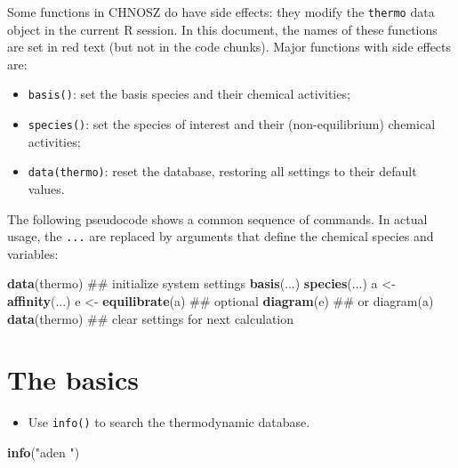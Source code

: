 \documentclass[]{tufte-handout}
\newenvironment{Shaded}{}{}
\newcommand{\KeywordTok}[1]{\textcolor[rgb]{0.00,0.44,0.13}{\textbf{#1}}}
\newcommand{\StringTok}[1]{\textcolor[rgb]{0.25,0.44,0.63}{#1}}
\newcommand{\NormalTok}[1]{#1}
\providecommand{\tightlist}{%
  \setlength{\itemsep}{0pt}\setlength{\parskip}{0pt}}
\begin{document}
Some functions in CHNOSZ do have side effects: they modify the
\texttt{thermo} data object in the current R session. In this document,
the names of these functions are set in {red text} (but not in the code
chunks). Major functions with side effects are:

\begin{itemize}
\tightlist
\item
  {\texttt{basis()}}: set the basis species and their chemical
  activities;
\item
  {\texttt{species()}}: set the species of interest and their
  (non-equilibrium) chemical activities;
\item
  {\texttt{data(thermo)}}: reset the database, restoring all settings to
  their default values.
\end{itemize}

The following pseudocode shows a common sequence of commands. In actual
usage, the \texttt{...} are replaced by arguments that define the
chemical species and variables:

\begin{Shaded}
\begin{Highlighting}[]
\KeywordTok{data}\NormalTok{(thermo)         ## initialize system settings}
\KeywordTok{basis}\NormalTok{(...)}
\KeywordTok{species}\NormalTok{(...)}
\NormalTok{a <-}\StringTok{ }\KeywordTok{affinity}\NormalTok{(...)}
\NormalTok{e <-}\StringTok{ }\KeywordTok{equilibrate}\NormalTok{(a)  ## optional}
\KeywordTok{diagram}\NormalTok{(e)           ## or diagram(a)}
\KeywordTok{data}\NormalTok{(thermo)         ## clear settings for next calculation}
\end{Highlighting}
\end{Shaded}

\section{The basics}\label{the-basics}

\begin{itemize}
\tightlist
\item
  Use {\texttt{info()}} to search the thermodynamic database.
\end{itemize}

\begin{Shaded}
\begin{Highlighting}[]
\KeywordTok{info}\NormalTok{(}\StringTok{"aden "}\NormalTok{)}
\end{Highlighting}
\end{Shaded}
\end{document}
